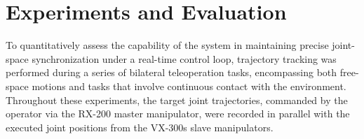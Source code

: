 \documentclass[a4paper, 10pt, conference]{ieeeconf}      %
\begin{document}




\section{Experiments and Evaluation}
To quantitatively assess the capability of the system in maintaining precise joint-space synchronization under a real-time control loop, trajectory tracking was performed during a series of bilateral teleoperation tasks, encompassing both free-space motions and tasks that involve continuous contact with the environment. Throughout these experiments, the target joint trajectories, commanded by the operator via the RX-200 master manipulator, were recorded in parallel with the executed joint positions from the VX-300s slave manipulators.
\end{document}
